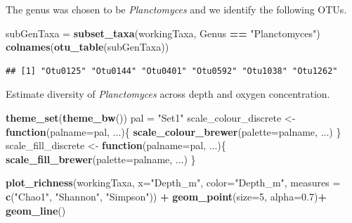 \documentclass[11 pt,]{article}
\newenvironment{Shaded}{\begin{snugshade}}{\end{snugshade}}
\newcommand{\KeywordTok}[1]{\textcolor[rgb]{0.13,0.29,0.53}{\textbf{#1}}}
\newcommand{\DataTypeTok}[1]{\textcolor[rgb]{0.13,0.29,0.53}{#1}}
\newcommand{\DecValTok}[1]{\textcolor[rgb]{0.00,0.00,0.81}{#1}}
\newcommand{\FloatTok}[1]{\textcolor[rgb]{0.00,0.00,0.81}{#1}}
\newcommand{\StringTok}[1]{\textcolor[rgb]{0.31,0.60,0.02}{#1}}
\newcommand{\ControlFlowTok}[1]{\textcolor[rgb]{0.13,0.29,0.53}{\textbf{#1}}}
\newcommand{\OperatorTok}[1]{\textcolor[rgb]{0.81,0.36,0.00}{\textbf{#1}}}
\newcommand{\NormalTok}[1]{#1}
\begin{document}
The genus was chosen to be \emph{Planctomyces} and we identify the
following OTUs.

\begin{Shaded}
\begin{Highlighting}[]
\NormalTok{subGenTaxa =}\StringTok{ }\KeywordTok{subset_taxa}\NormalTok{(workingTaxa, Genus }\OperatorTok{==}\StringTok{ "Planctomyces"}\NormalTok{)}
\KeywordTok{colnames}\NormalTok{(}\KeywordTok{otu_table}\NormalTok{(subGenTaxa))}
\end{Highlighting}
\end{Shaded}

\begin{verbatim}
## [1] "Otu0125" "Otu0144" "Otu0401" "Otu0592" "Otu1038" "Otu1262"
\end{verbatim}

Estimate diversity of \emph{Planctomyces} across depth and oxygen
concentration.

\begin{Shaded}
\begin{Highlighting}[]
\KeywordTok{theme_set}\NormalTok{(}\KeywordTok{theme_bw}\NormalTok{())}
\NormalTok{pal =}\StringTok{ "Set1"}
\NormalTok{scale_colour_discrete <-}\StringTok{  }\ControlFlowTok{function}\NormalTok{(}\DataTypeTok{palname=}\NormalTok{pal, ...)\{}
  \KeywordTok{scale_colour_brewer}\NormalTok{(}\DataTypeTok{palette=}\NormalTok{palname, ...)}
\NormalTok{\}}
\NormalTok{scale_fill_discrete <-}\StringTok{  }\ControlFlowTok{function}\NormalTok{(}\DataTypeTok{palname=}\NormalTok{pal, ...)\{}
  \KeywordTok{scale_fill_brewer}\NormalTok{(}\DataTypeTok{palette=}\NormalTok{palname, ...)}
\NormalTok{\}}

\KeywordTok{plot_richness}\NormalTok{(workingTaxa, }\DataTypeTok{x=}\StringTok{"Depth_m"}\NormalTok{, }\DataTypeTok{color=}\StringTok{"Depth_m"}\NormalTok{, }\DataTypeTok{measures =} \KeywordTok{c}\NormalTok{(}\StringTok{"Chao1"}\NormalTok{, }\StringTok{"Shannon"}\NormalTok{, }\StringTok{"Simpson"}\NormalTok{)) }\OperatorTok{+}\StringTok{ }\KeywordTok{geom_point}\NormalTok{(}\DataTypeTok{size=}\DecValTok{5}\NormalTok{, }\DataTypeTok{alpha=}\FloatTok{0.7}\NormalTok{)}\OperatorTok{+}\StringTok{ }\KeywordTok{geom_line}\NormalTok{()}
\end{Highlighting}
\end{Shaded}
\end{document}
